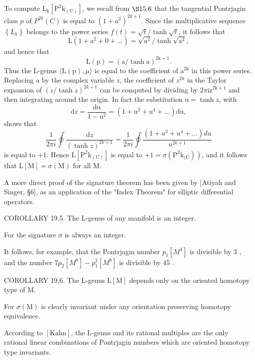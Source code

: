 \documentclass[10pt]{article}
\begin{document}
To compute $\mathrm{L}_{\mathrm{k}}\left[\mathrm{P}^{2} \mathrm{k}_{(\mathrm{C})}\right]$, we recall from $\S 15.6$ that the tangential Pontrjagin class $p$ of $P^{2 k}(C)$ is equal to $\left(1+a^{2}\right)^{2 k+1}$. Since the multiplicative sequence $\left\{L_{k}\right\}$ belongs to the power series $f(t)=\sqrt{t} / \tanh \sqrt{t}$, it follows that
$$
\mathrm{L}\left(1+\mathrm{a}^{2}+0+\ldots\right)=\sqrt{\mathrm{a}^{2}} / \tanh \sqrt{\mathrm{a}^{2}},
$$
and hence that
$$
\mathrm{L}(\mathrm{p})=(\mathrm{a} / \tanh \mathrm{a})^{2 \mathrm{k}+1} .
$$
Thus the L-genus $\langle\mathrm{L}(\mathrm{p}), \mu\rangle$ is equal to the coefficient of $\mathrm{a}^{2 \mathrm{k}}$ in this power series. Replacing a by the complex variable $z$, the coefficient of $z^{2 k}$ in the Taylor expansion of $(z / \tanh z)^{2 k+1}$ can be computed by dividing by $2 \pi \mathrm{iz}^{2 \mathrm{k}+1}$ and then integrating around the origin. In fact the substitution $\mathrm{u}=\tanh z$, with
$$
\mathrm{d} z=\frac{\mathrm{du}}{1-\mathrm{u}^{2}}=\left(1+\mathrm{u}^{2}+\mathrm{u}^{4}+\ldots\right) \mathrm{du},
$$
shows that
$$
\frac{1}{2 \pi i} \oint \frac{\mathrm{d} z}{(\tanh z)^{2 k+1}}=\frac{1}{2 \pi i} \oint \frac{\left(1+u^{2}+u^{4}+\ldots\right) d u}{u^{2 k+1}}
$$
is equal to $+1$. Hence $\mathrm{L}\left[\mathrm{P}^{2} \mathrm{k}_{(\mathrm{C})}\right]$ is equal to $\left.+1=\sigma\left(\mathrm{P}^{2} \mathrm{k}_{(\mathrm{C}}\right)\right)$, and it follows that $\mathrm{L}[\mathrm{M}]=\sigma(\mathrm{M})$ for all $\mathrm{M}$.

A more direct proof of the signature theorem has been given by [Atiyah and Singer, §6], as an application of the "Index Theorem" for elliptic differential operators.

COROLLARY 19.5. The L-genus of any manifold is an integer.

For the signature $\sigma$ is always an integer.

It follows, for example, that the Pontrjagin number $p_{1}\left[M^{4}\right]$ is divisible by 3 , and the number $7 p_{2}\left[M^{8}\right]-p_{1}^{2}\left[M^{8}\right]$ is divisible by 45 .

COROLLARY 19.6. The L-genus $\mathrm{L}[\mathrm{M}]$ depends only on the oriented homotopy type of M.

For $\sigma(\mathrm{M})$ is clearly invariant under any orientation preserving homotopy equivalence.

According to $[\mathrm{Kahn}]$, the L-genus and its rational multiples are the only rational linear combinations of Pontrjagin numbers which are oriented homotopy type invariants.
\end{document}
